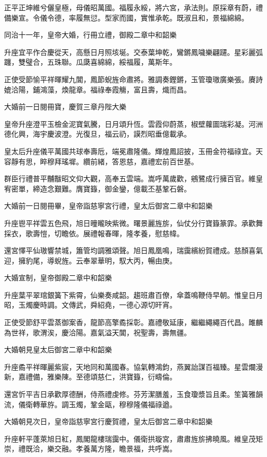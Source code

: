 \begin{pinyinscope}
正平正坤維兮儷皇極，母儀昭萬國。福履永綏，將六宮，承法則。原採章有蔚，禮備樂宣。令儀令德，率履無愆。型家而國，實惟承乾。既淑且和，景福綿綿。

同治十一年，皇帝大婚，行冊立禮，御殿二章中和韶樂

升座宜平作合慶從天，高懸日月照垓埏。交泰葉坤乾，鸞鏘鳳噦樂翩躚。星彩麗弧躔，雙璧合，五珠聯。瓜瓞喜綿綿，綏福履，萬斯年。

正使受節愉平祥暉耀九閶，鳳節蜺旌命肅將。雅調奏鏗鏘，玉管瓊璈廣樂張。賡詩媲洽陽，鋪鴻藻，煥龍章。福祿奉霞觴，富且壽，熾而昌。

大婚前一日閱冊寶，慶賀三章丹陛大樂

皇帝升座澄平玉檢金泥寶氣騰，日月頌升恆。雲霞仰蔚蒸，椒壁蘿圖瑞彩凝。河洲德化興，海宇慶波澄。光復旦，福云礽，謨烈昭垂億載承。

皇太后升座儀平萬國共球奉壽卮，端冕肅隆儀。輝煌鳳詔披，玉冊金符福祿宜。天容靜有思，睟穆拜瑤墀。纘前緒，答恩慈，嘉禮宏前百世基。

群臣行禮普平黼黻昭文仰大觀，高奉五雲端。嵩呼萬歲歡，鵷鷺成行擁百官。維皇宥密單，締造念艱難。膺寶籙，御金鑾，億載丕基鞏石磐。

大婚前一日閱冊畢，皇帝詣慈寧宮行禮，皇太后御宮二章中和韶樂

升座鬯平祥雲五色飛，旭日曈曨映紫微。曙景麗旌旂，仙仗分行寶籙篆霏。承歡舞採衣，歌壽愷，切瞻依。展禮報春暉，隆孝養，慰慈幃。

還宮懌平仙璈響禁城，簫管均調雅頌聲。旭日鳳凰鳴，瑞靄繽紛賀禮成。慈顏喜氣迎，擁豹尾，導蜺旌。云奉翠華明，馭大丙，暢由庚。

大婚宣制，皇帝御殿二章中和韶樂

升座葉平翠琯銀簧下紫霄，仙樂奏咸韶。趨班肅百僚，傘蓋鳴鞭侍早朝。惟皇日月昭，玉燭慶時調。文傳武，舜紹堯，一德心源切旰宵。

正使受節舒平雲蒸御案香，龍節高擎矞採彰。嘉禮敬延康，繼繼繩繩百代昌。雎麟為世祥，歌渭涘，慶洽陽。嘉氣溢天閶，祝聖壽，壽無疆。

大婚朝見皇太后御宮二章中和韶樂

升座矞平祥暉麗紫宸，天地同和萬國春。協氣轉鴻鈞，燕翼詒謀百福臻。星雲爛漫新，嘉禮備，雅樂陳。至德頌慈仁，洪寶籙，衍疇倫。

還宮忻平吉日承歡厚德酬，侍燕禮虔修。芬芳潔膳羞，玉食瓊漿旨且柔。笙簧雅韻流，儀衛轉華斿。調玉燭，鞏金甌，穆穆隆儀福祿遒。

大婚朝見次日，皇帝詣慈寧宮行慶賀禮，皇太后御宮二章中和韶樂

升座軒平蓬萊旭日紅，鳳閣龍樓瑞靄中。儀衛拱璇宮，肅肅旌旂拂曉風。維皇茂矩崇，禮既洽，樂交融。孝養萬方隆，瞻景福，共呼嵩。


\end{pinyinscope}
